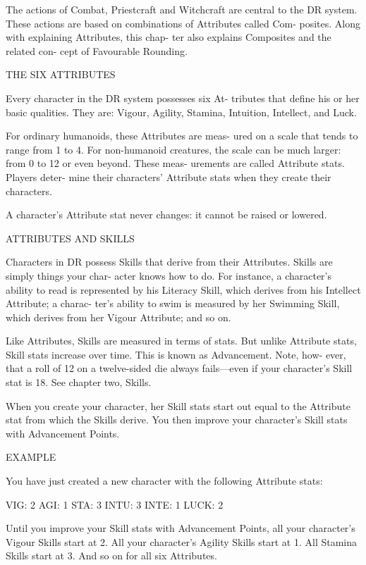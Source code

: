 \documentclass[11pt,twocolumn]{book}
\begin{document}
The actions of Combat, Priestcraft and Witchcraft are central to the DR system. These actions are based on combinations of Attributes called Com- posites. Along with explaining Attributes, this chap- ter also explains Composites and the related con- cept of Favourable Rounding.

THE SIX ATTRIBUTES

Every character in the DR system possesses six At- tributes that define his or her basic qualities. They are: Vigour, Agility, Stamina, Intuition, Intellect, and Luck.

For ordinary humanoids, these Attributes are meas- ured on a scale that tends to range from 1 to 4. For non-humanoid creatures, the scale can be much larger: from 0 to 12 or even beyond. These meas- urements are called Attribute stats. Players deter- mine their characters’ Attribute stats when they create their characters.

A character’s Attribute stat never changes: it cannot be raised or lowered.

ATTRIBUTES AND SKILLS

Characters in DR possess Skills that derive from their Attributes. Skills are simply things your char- acter knows how to do. For instance, a character’s ability to read is represented by his Literacy Skill, which derives from his Intellect Attribute; a charac- ter’s ability to swim is measured by her Swimming Skill, which derives from her Vigour Attribute; and so on.

Like Attributes, Skills are measured in terms of stats. But unlike Attribute stats, Skill stats increase over time. This is known as Advancement. Note, how- ever, that a roll of 12 on a twelve-sided die always fails—even if your character’s Skill stat is 18. See chapter two, Skills.

When you create your character, her Skill stats start out equal to the Attribute stat from which the Skills derive. You then improve your character’s Skill stats with Advancement Points.

\begin{mdframed}
EXAMPLE

You have just created a new character with the following Attribute stats:

VIG: 2 AGI: 1 STA: 3 INTU: 3 INTE: 1 LUCK: 2

Until you improve your Skill stats with Advancement Points, all your character’s Vigour Skills start at 2. All your character’s Agility Skills start at 1. All Stamina Skills start at 3. And so on for all six Attributes.
\end{mdframed}
\end{document}
